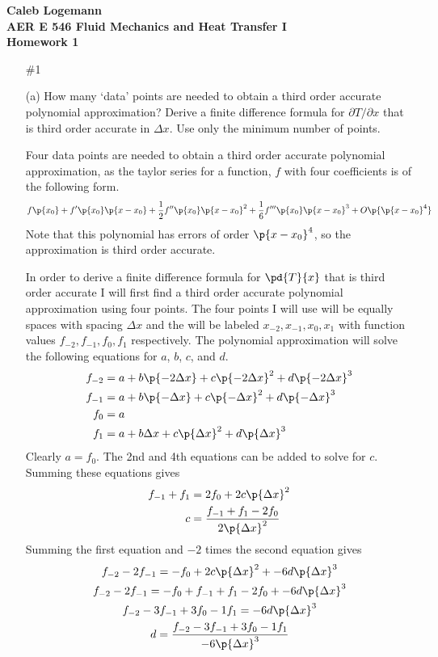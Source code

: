 \documentclass[11pt, oneside]{article}
\begin{document}
\noindent \textbf{\Large{Caleb Logemann \\
AER E 546 Fluid Mechanics and Heat Transfer I \\
Homework 1
}}

%
\begin{enumerate}
  \item[\#1] %
    \item[(a)] %
      How many `data' points are needed to obtain a third order accurate
      polynomial approximation?
      Derive a finite difference formula for $\partial T/\partial x$ that is
      third order accurate in $\Delta x$.
      Use only the minimum number of points.

      Four data points are needed to obtain a third order accurate polynomial
      approximation, as the taylor series for a function, $f$ with four coefficients
      is of the following form.
      \[
        f\p{x_0} + f'\p{x_0} \p{x-x_0} + \frac{1}{2} f''\p{x_0} \p{x - x_0}^2 + \frac{1}{6} f'''\p{x_0} \p{x - x_0}^3 + O\p{\p{x - x_0}^4}
      \]
      Note that this polynomial has errors of order $\p{x - x_0}^4$, so the
      approximation is third order accurate.

      In order to derive a finite difference formula for $\pd{T}{x}$ that is
      third order accurate I will first find a third order accurate polynomial
      approximation using four points.
      The four points I will use will be equally spaces with spacing $\Delta x$
      and the will be labeled $x_{-2}, x_{-1}, x_0, x_1$ with function values
      $f_{-2}, f_{-1}, f_0, f_1$ respectively.
      The polynomial approximation will solve the following equations for
      $a$, $b$, $c$, and $d$.
      \begin{align*}
        f_{-2} &= a + b \p{-2 \Delta x} + c \p{-2 \Delta x}^2 + d \p{-2 \Delta x}^3 \\
        f_{-1} &= a + b \p{-\Delta x} + c \p{-\Delta x}^2 + d \p{-\Delta x}^3 \\
        f_0 &= a \\
        f_1 &= a + b \Delta x + c \p{\Delta x}^2 + d \p{\Delta x}^3
      \end{align*}
      Clearly $a = f_0$.
      The 2nd and 4th equations can be added to solve for $c$.
      Summing these equations gives
      \begin{align*}
        f_{-1} + f_1 &= 2f_0 + 2 c \p{\Delta x}^2 \\
        c &= \frac{f_{-1} + f_1 - 2 f_0}{2 \p{\Delta x}^2}
      \end{align*}
      Summing the first equation and $-2$ times the second equation gives
      \begin{gather*}
        f_{-2} - 2 f_{-1} = -f_0 + 2 c \p{\Delta x}^2 + -6 d \p{\Delta x}^3 \\
        f_{-2} - 2 f_{-1} = -f_0 + f_{-1} + f_1 - 2 f_0 + -6 d \p{\Delta x}^3 \\
        f_{-2} - 3 f_{-1} + 3 f_0 - 1 f_1 = -6 d \p{\Delta x}^3 \\
        d = \frac{f_{-2} - 3 f_{-1} + 3 f_0 - 1 f_1}{-6 \p{\Delta x}^3}
      \end{gather*}


\end{enumerate}
\end{document}
